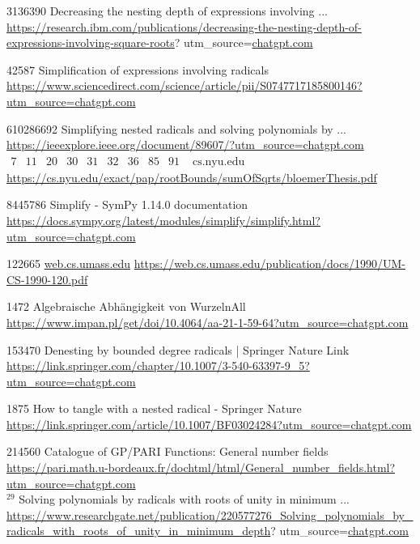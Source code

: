 \documentclass[10pt]{article}
\begin{document}
3136390 Decreasing the nesting depth of expressions involving ... \href{https://research.ibm.com/publications/decreasing-the-nesting-depth-of-expressions-involving-square-roots}{https://research.ibm.com/publications/decreasing-the-nesting-depth-of-expressions-involving-square-roots}? utm\_source=\href{http://chatgpt.com}{chatgpt.com}

42587 Simplification of expressions involving radicals \href{https://www.sciencedirect.com/science/article/pii/S0747717185800146?utm_source=chatgpt.com}{https://www.sciencedirect.com/science/article/pii/S0747717185800146?utm\_source=chatgpt.com}

610286692 Simplifying nested radicals and solving polynomials by ... \href{https://ieeexplore.ieee.org/document/89607/?utm_source=chatgpt.com}{https://ieeexplore.ieee.org/document/89607/?utm\_source=chatgpt.com}\\
$\begin{array}{llllllllll}7 & 11 & 20 & 30 & 31 & 32 & 36 & 85 & 91 & \text { cs.nyu.edu }\end{array}$ \href{https://cs.nyu.edu/exact/pap/rootBounds/sumOfSqrts/bloemerThesis.pdf}{https://cs.nyu.edu/exact/pap/rootBounds/sumOfSqrts/bloemerThesis.pdf}

8445786 Simplify - SymPy 1.14.0 documentation \href{https://docs.sympy.org/latest/modules/simplify/simplify.html?utm_source=chatgpt.com}{https://docs.sympy.org/latest/modules/simplify/simplify.html?utm\_source=chatgpt.com}

122665 \href{http://web.cs.umass.edu}{web.cs.umass.edu} \href{https://web.cs.umass.edu/publication/docs/1990/UM-CS-1990-120.pdf}{https://web.cs.umass.edu/publication/docs/1990/UM-CS-1990-120.pdf}

1472 Algebraische Abhängigkeit von WurzelnAll \href{https://www.impan.pl/get/doi/10.4064/aa-21-1-59-64?utm_source=chatgpt.com}{https://www.impan.pl/get/doi/10.4064/aa-21-1-59-64?utm\_source=chatgpt.com}

153470 Denesting by bounded degree radicals | Springer Nature Link \href{https://link.springer.com/chapter/10.1007/3-540-63397-9_5?utm_source=chatgpt.com}{https://link.springer.com/chapter/10.1007/3-540-63397-9\_5?utm\_source=chatgpt.com}

1875 How to tangle with a nested radical - Springer Nature \href{https://link.springer.com/article/10.1007/BF03024284?utm_source=chatgpt.com}{https://link.springer.com/article/10.1007/BF03024284?utm\_source=chatgpt.com}

214560 Catalogue of GP/PARI Functions: General number fields \href{https://pari.math.u-bordeaux.fr/dochtml/html/General_number_fields.html?utm_source=chatgpt.com}{https://pari.math.u-bordeaux.fr/dochtml/html/General\_number\_fields.html?utm\_source=chatgpt.com}\\
${ }^{29}$ Solving polynomials by radicals with roots of unity in minimum ... \href{https://www.researchgate.net/publication/220577276_Solving_polynomials_by_radicals_with_roots_of_unity_in_minimum_depth}{https://www.researchgate.net/publication/220577276\_Solving\_polynomials\_by\_radicals\_with\_roots\_of\_unity\_in\_minimum\_depth}? utm\_source=\href{http://chatgpt.com}{chatgpt.com}
\end{document}
